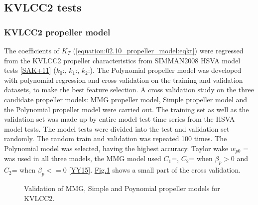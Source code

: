 \documentclass[review]{elsarticle}
\begin{document}
\subsection{KVLCC2 tests}
\label{\detokenize{06.20_results_kvlcc2:kvlcc2-tests}}\label{\detokenize{06.20_results_kvlcc2::doc}}

\subsubsection{KVLCC2 propeller model}
\label{\detokenize{06.20_results_kvlcc2:kvlcc2-propeller-model}}
\sphinxAtStartPar
The coefficients of \(K_T\) (\autoref{equation:02.10_propeller_model:eqkt}) were regressed from the KVLCC2 propeller characteristics from SIMMAN2008 HSVA model tests {[}\hyperlink{cite.bibligraphy:id79}{SAK+11}{]} (\(k_0\):, \(k_1\):, \(k_2\):).
The Polynomial propeller model was developed with polynomial regression and cross validation on the training and validation datasets, to make the best feature selection.
A cross validation study on the three candidate propeller models: MMG propeller model, Simple propeller model and the Polynomial propeller model were carried out. The training set as well as the validation set was made up by entire model test time series from the HSVA model tests.
The model tests were divided into the test and validation set randomly. The random train and validation was repeated 100 times. The Polynomial model was selected, having the highest accuracy. Taylor wake \(w_{p0}\) =  was used in all three models, the MMG model used \(C_1\)=, \(C_2\)= when \(\beta_p>0\) and \(C_2\)= when \(\beta_p<=0\) {[}\hyperlink{cite.bibligraphy:id22}{YY15}{]}. \hyperref[\detokenize{06.20_results_kvlcc2:fig-propeller-validation}]{Fig.\@ \ref{\detokenize{06.20_results_kvlcc2:fig-propeller-validation}}} shows a small part of the cross validation.

\begin{figure}[H]
\centering
\capstart

\noindent{}
\caption{Validation of MMG, Simple and Poynomial propeller models for KVLCC2.}\label{\detokenize{06.20_results_kvlcc2:fig-propeller-validation}}\end{figure}
\end{document}
